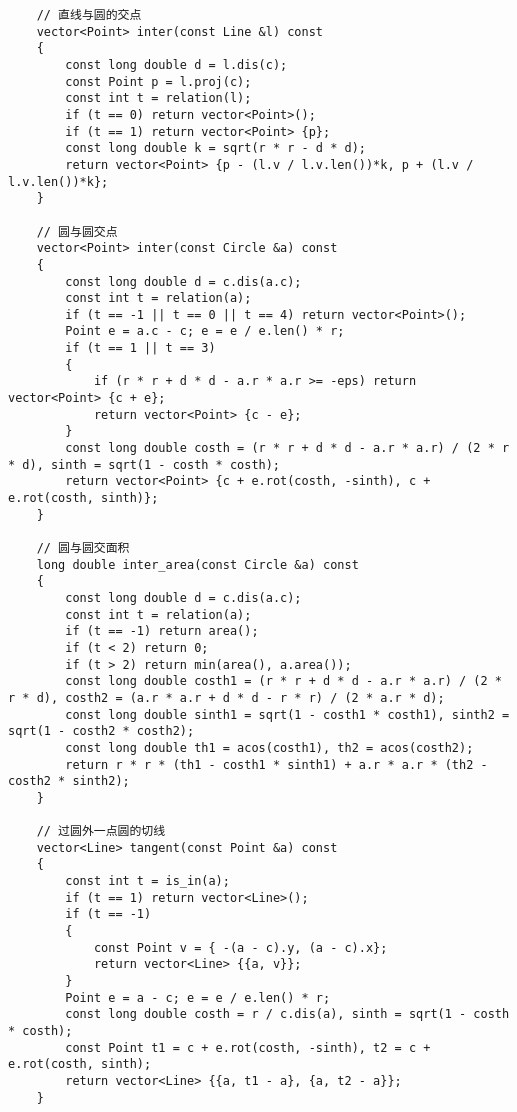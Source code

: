 \documentclass[a4paper,10pt]{article}
\begin{document}
\begin{lstlisting}
    // 直线与圆的交点
    vector<Point> inter(const Line &l) const
    {
        const long double d = l.dis(c);
        const Point p = l.proj(c);
        const int t = relation(l);
        if (t == 0) return vector<Point>();
        if (t == 1) return vector<Point> {p};
        const long double k = sqrt(r * r - d * d);
        return vector<Point> {p - (l.v / l.v.len())*k, p + (l.v / l.v.len())*k};
    }

    // 圆与圆交点
    vector<Point> inter(const Circle &a) const
    {
        const long double d = c.dis(a.c);
        const int t = relation(a);
        if (t == -1 || t == 0 || t == 4) return vector<Point>();
        Point e = a.c - c; e = e / e.len() * r;
        if (t == 1 || t == 3)
        {
            if (r * r + d * d - a.r * a.r >= -eps) return vector<Point> {c + e};
            return vector<Point> {c - e};
        }
        const long double costh = (r * r + d * d - a.r * a.r) / (2 * r * d), sinth = sqrt(1 - costh * costh);
        return vector<Point> {c + e.rot(costh, -sinth), c + e.rot(costh, sinth)};
    }

    // 圆与圆交面积
    long double inter_area(const Circle &a) const
    {
        const long double d = c.dis(a.c);
        const int t = relation(a);
        if (t == -1) return area();
        if (t < 2) return 0;
        if (t > 2) return min(area(), a.area());
        const long double costh1 = (r * r + d * d - a.r * a.r) / (2 * r * d), costh2 = (a.r * a.r + d * d - r * r) / (2 * a.r * d);
        const long double sinth1 = sqrt(1 - costh1 * costh1), sinth2 = sqrt(1 - costh2 * costh2);
        const long double th1 = acos(costh1), th2 = acos(costh2);
        return r * r * (th1 - costh1 * sinth1) + a.r * a.r * (th2 - costh2 * sinth2);
    }

    // 过圆外一点圆的切线
    vector<Line> tangent(const Point &a) const
    {
        const int t = is_in(a);
        if (t == 1) return vector<Line>();
        if (t == -1)
        {
            const Point v = { -(a - c).y, (a - c).x};
            return vector<Line> {{a, v}};
        }
        Point e = a - c; e = e / e.len() * r;
        const long double costh = r / c.dis(a), sinth = sqrt(1 - costh * costh);
        const Point t1 = c + e.rot(costh, -sinth), t2 = c + e.rot(costh, sinth);
        return vector<Line> {{a, t1 - a}, {a, t2 - a}};
    }


\end{lstlisting}
\end{document}

